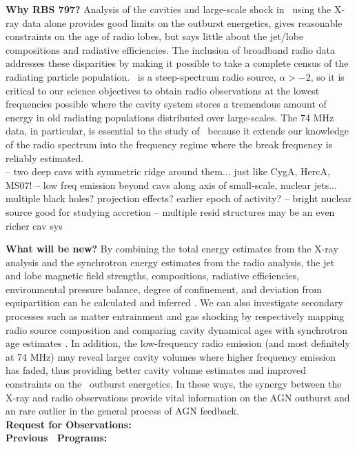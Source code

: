 \documentclass[letterpaper,11pt]{article}
\begin{document}
{\bf{Why RBS 797?}} Analysis of the cavities and large-scale shock in
\ms\ using the X-ray data alone provides good limits on the outburst
energetics, gives reasonable constraints on the age of radio lobes,
but says little about the jet/lobe compositions and radiative
efficiencies. The inclusion of broadband radio data addresses these
disparities by making it possible to take a complete census of the
radiating particle population. \ms\ is a steep-spectrum radio source,
$\alpha > -2$, so it is critical to our science objectives to obtain
radio observations at the lowest frequencies possible where the cavity
system stores a tremendous amount of energy in old radiating
populations distributed over large-scales. The 74 MHz data, in
particular, is essential to the study of \ms\ because it extends our
knowledge of the radio spectrum into the frequency regime where the
break frequency is reliably estimated.\\

-- two deep cavs with symmetric ridge around them... just like CygA,
HercA, MS07!
-- low freq emission beyond cavs along axis of small-scale, nuclear
jets... multiple black holes? projection effects? earlier epoch of
activity?
-- bright nuclear source good for studying accretion 
-- multiple resid structures may be an even richer cav sys

{\bf{What will be new?}} By combining the total energy estimates from
the X-ray analysis and the synchrotron energy estimates from the radio
analysis, the jet and lobe magnetic field strengths, compositions,
radiative efficiencies, environmental pressure balance, degree of
confinement, and deviation from equipartition can be calculated and
inferred \cite[\eg][]{2003MNRAS.342..399G, 2004AJ....127...48L,
  2005MNRAS.364.1343D, 2006MNRAS.372.1741D, 2006ApJ...648..200D,
  birzan08, pjet}. We can also investigate secondary processes such as
matter entrainment and gas shocking by respectively mapping radio
source composition and comparing cavity dynamical ages with
synchrotron age estimates \cite[\eg][]{2006ApJ...644L...9W,
  birzan08}. In addition, the low-frequency radio emission (and most
definitely at 74 MHz) may reveal larger cavity volumes where higher
frequency emission has faded, thus providing better cavity volume
estimates and improved constraints on the \ms\ outburst energetics. In
these ways, the synergy between the X-ray and radio observations
provide vital information on the AGN outburst and an rare outlier in
the general process of AGN feedback.\\

{\bf{Request for Observations:}}\\
{\bf{Previous \chandra\ Programs:}}


\end{document}
